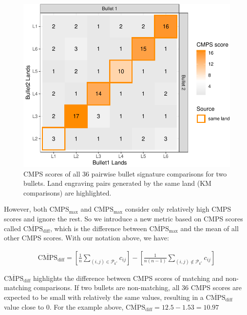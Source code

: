 \begin{Schunk}
\begin{figure}

{\centering \includegraphics[width=.7\textwidth]{ju-hofmann_files/figure-latex/tiles-1} 

}

\caption{CMPS scores of all 36 pairwise bullet signature comparisons for two bullets. Land engraving pairs generated by the same land (KM comparisons) are highlighted. }\label{fig:tiles}
\end{figure}
\end{Schunk}

However, both \(\mathrm{CMPS_{max}}\) and
\(\mathrm{\overline{CMPS}_{max}}\) consider only relatively high CMPS
scores and ignore the rest. So we introduce a new metric based on CMPS
scores called \(\mathrm{\overline{CMPS}_{diff}}\), which is the
difference between \(\mathrm{\overline{CMPS}_{max}}\) and the mean of
all other CMPS scores. With our notation above, we have:

\begin{align}
\mathrm{\overline{CMPS}_{diff}} = \left[  \frac{1}{n} \sum_{(i,j) \in \mathcal{P}_{k^*}} c_{ij}\right] - \left[  \frac{1}{n(n-1)} \sum_{(i,j) \notin \mathcal{P}_{k^*}} c_{ij}\right]
\end{align}

\(\mathrm{\overline{CMPS}_{diff}}\) highlights the difference between
CMPS scores of matching and non-matching comparisons. If two bullets are
non-matching, all 36 CMPS scores are expected to be small with
relatively the same values, resulting in a
\(\mathrm{\overline{CMPS}_{diff}}\) value close to 0. For the example
above, \(\mathrm{\overline{CMPS}_{diff}} = 12.5 - 1.53 = 10.97\)

